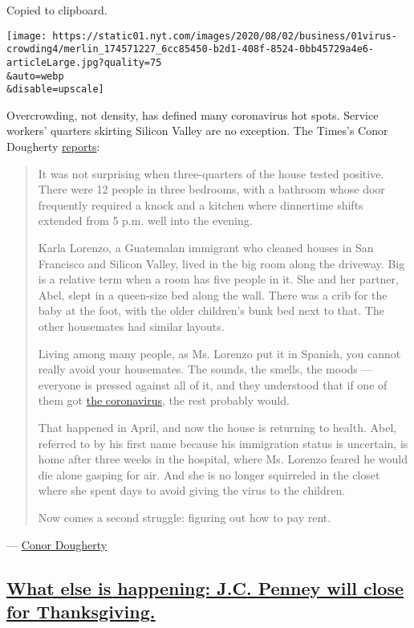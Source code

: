 Copied to clipboard.

\texttt{[image: https://static01.nyt.com/images/2020/08/02/business/01virus-crowding4/merlin\_174571227\_6cc85450-b2d1-408f-8524-0bb45729a4e6-articleLarge.jpg?quality=75\\\&auto=webp\\\&disable=upscale]}

Overcrowding, not density, has defined many coronavirus hot spots.
Service workers' quarters skirting Silicon Valley are no exception. The
Times's Conor Dougherty
\href{https://www.nytimes.com/2020/08/01/business/economy/housing-overcrowding-coronavirus.html}{reports}:

\begin{quote}
It was not surprising when three-quarters of the house tested positive.
There were 12 people in three bedrooms, with a bathroom whose door
frequently required a knock and a kitchen where dinnertime shifts
extended from 5 p.m. well into the evening.

Karla Lorenzo, a Guatemalan immigrant who cleaned houses in San
Francisco and Silicon Valley, lived in the big room along the driveway.
Big is a relative term when a room has five people in it. She and her
partner, Abel, slept in a queen-size bed along the wall. There was a
crib for the baby at the foot, with the older children's bunk bed next
to that. The other housemates had similar layouts.

Living among many people, as Ms. Lorenzo put it in Spanish, you cannot
really avoid your housemates. The sounds, the smells, the moods ---
everyone is pressed against all of it, and they understood that if one
of them got \href{https://www.nytimes.com/news-event/coronavirus}{the
coronavirus}, the rest probably would.

That happened in April, and now the house is returning to health. Abel,
referred to by his first name because his immigration status is
uncertain, is home after three weeks in the hospital, where Ms. Lorenzo
feared he would die alone gasping for air. And she is no longer
squirreled in the closet where she spent days to avoid giving the virus
to the children.

Now comes a second struggle: figuring out how to pay rent.
\end{quote}

--- \href{https://www.nytimes.com/by/conor-dougherty}{Conor Dougherty}

\hypertarget{what-else-is-happening-jc-penney-will-close-for-thanksgiving}{%
\subsection{\texorpdfstring{\protect\hyperlink{what-else-is-happening-jc-penney-will-close-for-thanksgiving}{What
else is happening: J.C. Penney will close for
Thanksgiving.}}{What else is happening: J.C. Penney will close for Thanksgiving.}}\label{what-else-is-happening-jc-penney-will-close-for-thanksgiving}}

